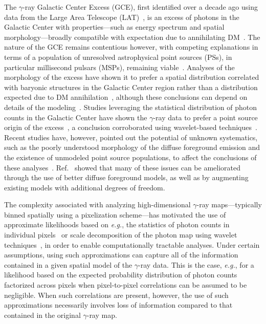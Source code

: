 \documentclass[prd,aps,10pt,nofootinbib,twocolumn,superscriptaddress,preprintnumbers,balancelastpage,longbibliography,floatfix]{revtex4-2}
\begin{document}
The \Fermi $\gamma$-ray Galactic Center Excess (GCE), first identified over a decade ago using data from the \Fermi Large Area Telescope (LAT)~\cite{Atwood:2009ez}, is an excess of photons in the Galactic Center with properties---such as energy spectrum and spatial morphology---broadly compatible with expectation due to annihilating DM~\cite{Goodenough:2009gk,Hooper:2010mq,Boyarsky:2010dr,Hooper:2011ti,Abazajian:2012pn,Hooper:2013rwa,Gordon:2013vta,Abazajian:2014fta,Daylan:2014rsa,Calore:2014xka,Abazajian:2014hsa,TheFermi-LAT:2015kwa,Linden:2016rcf,Macias:2016nev,Clark:2016mbb}. The nature of the GCE remains contentious however, with competing explanations in terms of a population of unresolved astrophysical point sources (PSs), in particular millisecond pulsars (MSPs), remaining viable~\cite{Abazajian:2014fta,Abazajian:2010zy,Hooper:2013nhl,Calore:2014oga,Cholis:2014lta,Petrovic:2014xra,Yuan:2014yda,Brandt:2015ula,Gautam:2021wqn,Ploeg:2020jeh}. Analyses of the morphology of the excess have shown it to prefer a spatial distribution correlated with baryonic structures in the Galactic Center region rather than a distribution expected due to DM annihilation~\cite{Macias:2016nev,Macias:2019omb,Bartels:2017vsx}, although these conclusions can depend on details of the modeling~\cite{DiMauro:2020rcr,DiMauro:2021raz}. Studies leveraging the statistical distribution of photon counts in the Galactic Center have shown the $\gamma$-ray data to prefer a point source origin of the excess~\cite{Lee:2015fea,Bartels:2015aea,Buschmann:2020adf,Chang:2019ars}, a conclusion corroborated using wavelet-based techniques~\cite{Bartels:2015aea}. Recent studies have, however, pointed out the potential of unknown systematics, such as the poorly understood morphology of the diffuse foreground emission and the existence of unmodeled point source populations, to affect the conclusions of these analyses~\cite{Leane:2019xiy}. Ref.~\cite{Buschmann:2020adf} showed that many of these issues can be ameliorated through the use of better diffuse foreground models, as well as by augmenting existing models with additional degrees of freedom.

The complexity associated with analyzing high-dimensional $\gamma$-ray maps---typically binned spatially using a pixelization scheme---has motivated the use of approximate likelihoods based on \emph{e.g.}, the statistics of photon counts in individual pixels~\cite{Malyshev:2011zi,Lee:2014mza,Lee:2015fea} or scale decomposition of the photon map using wavelet techniques~\cite{Bartels:2015aea,Balaji:2018rwz,McDermott:2015ydv,Zhong:2019ycb}, in order to enable computationally tractable analyses. Under certain assumptions, using such approximations can capture all of the information contained in a given spatial model of the $\gamma$-ray data. This is the case, \emph{e.g.}, for a likelihood based on the expected probability distribution of photon counts factorized across pixels when pixel-to-pixel correlations can be assumed to be negligible. When such correlations are present, however, the use of such approximations necessarily involves loss of information compared to that contained in the original $\gamma$-ray map.
\end{document}
